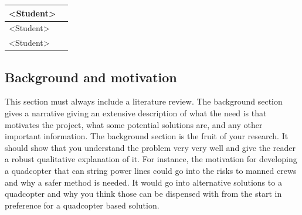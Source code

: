 \documentclass[fleqn,10pt]{project}
\begin{document}
\begin{table}[!h]
\begin{centering}
\begin{tabular}{|ll|}
\multicolumn{1}{|l|}{{\color[HTML]{FF0000} \textless{}Student\textgreater{}}} &                                                                                                                                                                                                                                                                                                                                                                                                                                                                                                            \\ \hline
\multicolumn{1}{|l|}{{\color[HTML]{FF0000} \textless{}Student\textgreater{}}} &                                                                                                                                                                                                                                                                                                                                                                                                                                                                                                            \\ \hline
\multicolumn{1}{|l|}{{\color[HTML]{FF0000} \textless{}Student\textgreater{}}} &                                                                                                                                                                                                                                                                                                                                                                                                                                                                                                            \\ \hline
\end{tabular}
\end{centering}
\end{table}

\subsection{Background and motivation}

This section must always include a literature review.  The background section gives a narrative giving an extensive description of what the need is
that motivates the project, what some potential solutions are, and any other important information. 
The background section is the fruit of your research. It should show that you understand the 
problem very very well and give the reader a robust qualitative explanation of it. For instance, 
the motivation for developing a quadcopter that can string power lines could go into the risks 
to manned crews and why a safer method is needed. It would go into alternative solutions to a 
quadcopter and why you think those can be dispensed with from the start in preference for a quadcopter based solution.
\end{document}
